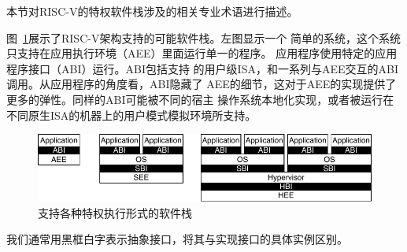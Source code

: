 本节对RISC-V的特权软件栈涉及的相关专业术语进行描述。


图~\ref{fig:privimps}展示了RISC-V架构支持的可能软件栈。左图显示一个
简单的系统，这个系统只支持在应用执行环境（AEE）里面运行单一的程序。
应用程序使用特定的应用程序接口（ABI）运行。ABI包括支持
的用户级ISA，和一系列与AEE交互的ABI调用。从应用程序的角度看，ABI隐藏了
AEE的细节，这对于AEE的实现提供了更多的弹性。同样的ABI可能被不同的宿主
操作系统本地化实现，或者被运行在不同原生ISA的机器上的用户模式模拟环境所支持。

\begin{figure}[th]
\centering
\includegraphics[width=\textwidth]{figs/privimps.pdf}
\caption{支持各种特权执行形式的软件栈
  }
\label{fig:privimps}
\end{figure}

\begin{commentary}

我们通常用黑框白字表示抽象接口，将其与实现接口的具体实例区别。
\end{commentary}


